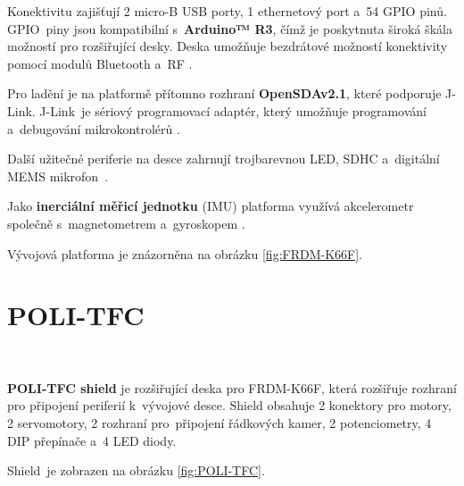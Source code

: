 Konektivitu zajišťují 2 micro-B USB porty, 1 ethernetový port a~54 GPIO pinů.
GPIO~piny jsou kompatibilní s~\textbf{Arduino™ R3}, čímž je poskytnuta široká škála
možností pro rozšiřující desky. Deska umožňuje bezdrátové možností konektivity
pomocí modulů Bluetooth a~RF \cite{frdmk66UserGuide}.

Pro ladění je na platformě přítomno rozhraní \textbf{OpenSDAv2.1}, které podporuje
J-Link. J-Link~je sériový programovací adaptér, který umožňuje programování
a~debugování mikrokontrolérů \cite{frdmk66UserGuide}.

Další užitečné periferie na desce zahrnují trojbarevnou LED, SDHC a~digitální MEMS
mikrofon~\cite{frdmk66UserGuide}.

Jako \textbf{inerciální měřicí jednotku} (IMU) platforma využívá akcelerometr
společně s~magnetometrem a~gyroskopem \cite{frdmk66UserGuide}.

Vývojová platforma je znázorněna na obrázku \ref{fig:FRDM-K66F}.

\section{POLI-TFC}
\label{sec:POLI-TFC}\

\textbf{POLI-TFC shield} je rozšiřující deska pro FRDM-K66F, která rozšiřuje
rozhraní pro připojení periferií k~vývojové desce. Shield obsahuje 2 konektory
pro motory, 2 servomotory, 2 rozhraní pro~připojení řádkových kamer, 2 
potenciometry, 4 DIP přepínače a~4 LED diody. 

Shield~je zobrazen na obrázku \ref{fig:POLI-TFC}.

